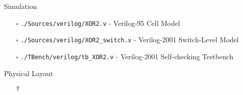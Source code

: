 \begin{center}
    Simulation
    \begin{itemize}
        \item[$\square$] \texttt{./Sources/verilog/XOR2.v} - Verilog-95 Cell Model \\
        \item[$\square$] \texttt{./Sources/verilog/XOR2\_switch.v} - Verilog-2001 Switch-Level Model \\
        \item[$\square$] \texttt{./TBench/verilog/tb\_XOR2.v} - Verilog-2001 Self-checking Testbench
    \end{itemize}
    Physical Layout
    \begin{itemize}
        \item[\checkmark] \texttt{?}
    \end{itemize}
\end{center}
